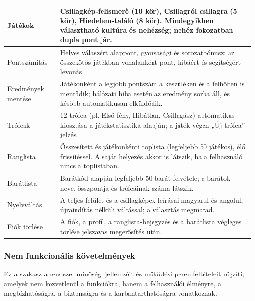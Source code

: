 \documentclass[12pt,a4paper]{article}
\begin{document}
{\begin{longtable}{|L{4.3cm}|L{10.75cm}|}
  Játékok & Csillagkép-felismerő (10 kör), Csillagról csillagra (5 kör), Hiedelem-találó (8
  kör). Mindegyikben választható kultúra és nehézség; nehéz fokozatban dupla pont jár. \\ \hline
  Pontszámítás & Helyes válaszért alappont, gyorsasági és sorozatbónusz; az összekötős játékban
  vonalanként pont, hibáért és segítségért levonás. \\ \hline
  Eredmények mentése & Játékonként a legjobb pontszám a készüléken és a felhőben is mentődik;
  hálózati hiba esetén az eredmény sorba áll, és később automatikusan elküldődik. \\ \hline
  Trófeák & 12 trófea (pl. Első fény, Hibátlan, Csillagász) automatikus kiosztása a
  játékstatisztika alapján; a játék végén „Új trófea” jelzés. \\ \hline
  Ranglista & Összesített és játékonkénti toplista (legfeljebb 50 játékos), élő frissítéssel. A
  saját helyezés akkor is látszik, ha a felhasználó nincs a toplistában. \\ \hline
  Barátlista & Barátkód alapján legfeljebb 50 barát felvétele; a barátok neve, összpontja és
  trófeáinak száma látszik. \\ \hline
  Nyelvváltás & A teljes felület és a csillagképek leírásai magyarul és angolul, újraindítás
  nélküli váltással; a választás megmarad. \\ \hline
  Fiók törlése & A fiók, a profil, a ranglista-bejegyzés és a barátlista végleges törlése
  jelszavas megerősítés után. \\ \hline
\end{longtable}
}

\subsubsection{Nem funkcionális követelmények}

Ez a szakasz a rendszer minőségi jellemzőit és működési peremfeltételeit rögzíti, amelyek nem
közvetlenül a funkciókra, hanem a felhasználói élményre, a megbízhatóságra, a biztonságra és a
karbantarthatóságra vonatkoznak.
\end{document}
